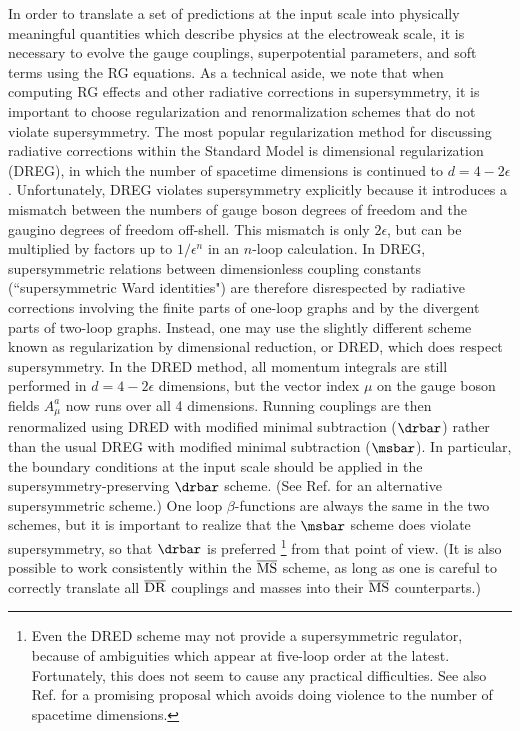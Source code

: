 In order to translate a set of predictions at the input scale into
physically meaningful quantities which describe physics at the electroweak
scale, it is necessary to evolve the gauge couplings,
superpotential parameters, and soft terms using the RG equations.
As a technical aside, we note that when computing RG effects and other
radiative corrections in supersymmetry, it is important to choose
regularization and renormalization schemes that do not violate
supersymmetry.
The most popular regularization method for discussing radiative
corrections within the Standard Model is dimensional regularization
(DREG), in which the number of spacetime dimensions is continued
to $d=4-2\epsilon$. Unfortunately, DREG 
violates supersymmetry explicitly because it introduces a
mismatch between
the numbers of gauge boson degrees of freedom and
the gaugino degrees of freedom off-shell.
This mismatch is only $2\epsilon$, but can be multiplied by factors
up to $1/\epsilon^n$ in an $n$-loop calculation.
In DREG, supersymmetric relations between dimensionless coupling
constants (``supersymmetric Ward identities") are therefore disrespected
by radiative corrections involving
the finite parts of one-loop graphs and
by the divergent parts of two-loop graphs. Instead, one may
use the slightly different scheme known as regularization by dimensional
reduction, or DRED, which does respect supersymmetry.\cite{DRED}
In the DRED method, all momentum integrals are still performed in
$d=4-2\epsilon$
dimensions, but the vector index $\mu$ on the gauge boson fields
$A^a_\mu$ now runs over all 4 dimensions. Running couplings are then
renormalized using DRED with modified minimal subtraction ($\drbar$)
rather than the usual DREG with modified minimal subtraction ($\msbar$).
In particular, the boundary conditions at the input scale should be
applied
in the supersymmetry-preserving $\drbar$ scheme. (See Ref.\cite{Shifman}
for an alternative supersymmetric scheme.) One loop $\beta$-functions
are always the same in the two schemes, but it is important to
realize that the $\msbar$ scheme does violate supersymmetry, so that
$\drbar$ is preferred \footnote{Even the DRED
scheme may not provide a supersymmetric regulator, because of
ambiguities which appear at five-loop order at the
latest.\cite{DREDdies}
Fortunately, this does not seem to cause any practical
difficulties.\cite{JJperspective} See also Ref.\cite{Woodard} for a
promising proposal which avoids doing violence
to the number of spacetime dimensions.} from that point of view.
(It is also possible to work consistently within the
$\overline{\rm MS}$ scheme, as long as one is careful to 
correctly translate all
$\overline{\rm DR}$ couplings and masses into their
$\overline{\rm MS}$
counterparts.\cite{%
gluinopolemass,mstodrmore})

